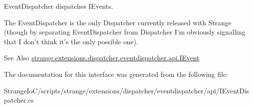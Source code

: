 Event\-Dispatcher dispatches I\-Events.

The Event\-Dispatcher is the only Dispatcher currently released with Strange (though by separating Event\-Dispatcher from Dispatcher I'm obviously signalling that I don't think it's the only possible one).

\begin{DoxySeeAlso}{See Also}
\hyperlink{interfacestrange_1_1extensions_1_1dispatcher_1_1eventdispatcher_1_1api_1_1_i_event}{strange.\-extensions.\-dispatcher.\-eventdispatcher.\-api.\-I\-Event} 
\end{DoxySeeAlso}


The documentation for this interface was generated from the following file\-:\begin{DoxyCompactItemize}
\item 
Strange\-Io\-C/scripts/strange/extensions/dispatcher/eventdispatcher/api/I\-Event\-Dispatcher.\-cs\end{DoxyCompactItemize}
